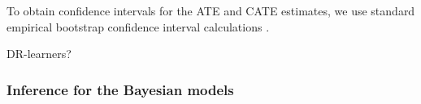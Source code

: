\documentclass[12pt, a4paper]{article}
\begin{document}


To obtain confidence intervals for the ATE and CATE estimates, we use standard
empirical bootstrap confidence interval calculations \citep{efron1986}.



DR-learners?

\subsubsection*{Inference for the Bayesian models}
\end{document}
